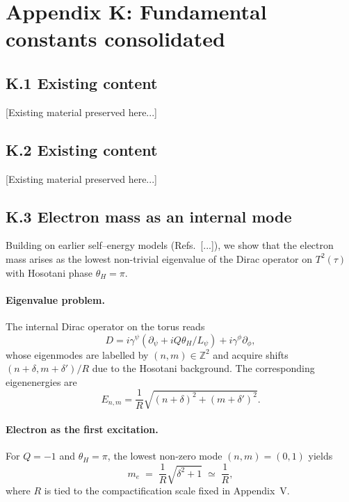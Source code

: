 
\appendix
\section*{Appendix K: Fundamental constants consolidated}

\subsection*{K.1 Existing content}
[Existing material preserved here...]

\subsection*{K.2 Existing content}
[Existing material preserved here...]

\subsection*{K.3 Electron mass as an internal mode}

Building on earlier self–energy models (Refs.~[...]), we show that the electron 
mass arises as the lowest non-trivial eigenvalue of the Dirac operator on 
$T^2(\tau)$ with Hosotani phase $\theta_H=\pi$. 

\paragraph{Eigenvalue problem.}
The internal Dirac operator on the torus reads
\begin{equation}
D = i\gamma^\psi \left(\partial_\psi + i Q \theta_H/L_\psi\right) 
  + i\gamma^\phi \partial_\phi ,
\end{equation}
whose eigenmodes are labelled by $(n,m)\in\mathbb{Z}^2$ and acquire shifts 
$(n+\delta, m+\delta')/R$ due to the Hosotani background. 
The corresponding eigenenergies are
\begin{equation}
E_{n,m} = \frac{1}{R}\sqrt{(n+\delta)^2 + (m+\delta')^2}.
\end{equation}

\paragraph{Electron as the first excitation.}
For $Q=-1$ and $\theta_H=\pi$, the lowest non-zero mode $(n,m)=(0,1)$ yields 
\begin{equation}
m_e \;=\; \frac{1}{R}\sqrt{\delta^2+1}\;\simeq\;\frac{1}{R},
\end{equation}
where $R$ is tied to the compactification scale fixed in Appendix~V. 

